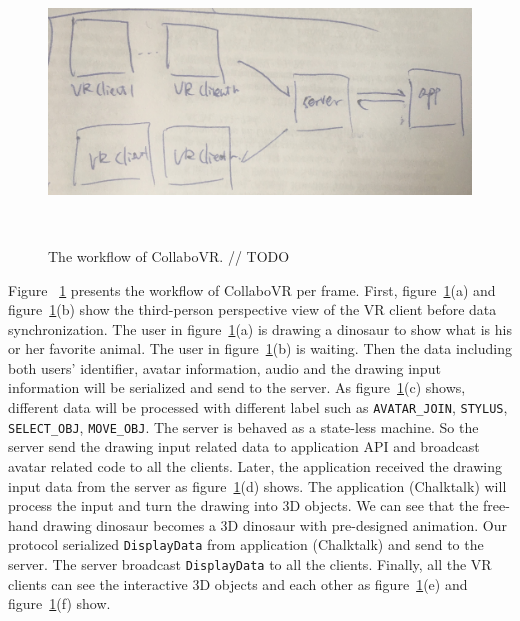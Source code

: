 \documentclass{sigchi}
\begin{document}
\begin{figure}[htb!]
 \centering
 \includegraphics[width=1.75\columnwidth]{workflow}
 \caption{The workflow of CollaboVR.
 // TODO
 }~\label{fig:workflow}
\end{figure}

Figure ~\ref{fig:workflow} presents the workflow of CollaboVR per frame. First, figure~\ref{fig:workflow}(a) and figure~\ref{fig:workflow}(b) show the third-person perspective view of the VR client before data synchronization. The user in figure~\ref{fig:workflow}(a) is drawing a dinosaur to show what is his or her favorite animal. The user in figure~\ref{fig:workflow}(b) is waiting. Then the data including both users' identifier, avatar information, audio and the drawing input information will be serialized and send to the server. As figure~\ref{fig:workflow}(c) shows, different data will be processed with different label such as \verb|AVATAR_JOIN|, \verb|STYLUS|, \verb|SELECT_OBJ|, \verb|MOVE_OBJ|. The server is behaved as a state-less machine. So the server send the drawing input related data to application API and broadcast avatar related code to all the clients. Later, the application received the drawing input data from the server as figure~\ref{fig:workflow}(d) shows. The application (Chalktalk) will process the input and turn the drawing into 3D objects. We can see that the free-hand drawing dinosaur becomes a 3D dinosaur with pre-designed animation. Our protocol serialized \verb|DisplayData| from application (Chalktalk) and send to the server. The server broadcast \verb|DisplayData| to all the clients. Finally, all the VR clients can see the interactive 3D objects and each other as figure~\ref{fig:workflow}(e) and figure~\ref{fig:workflow}(f) show.
\end{document}
